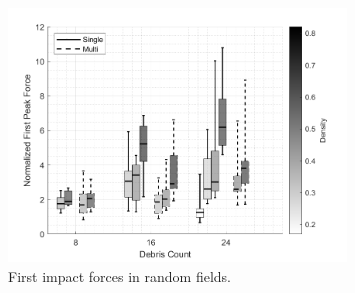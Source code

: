 \documentclass{article}
\begin{document}
\begin{figure}[htbp]
    \centering
    \includegraphics[width=0.8\textwidth]{First_Peak_Random_Single_vs_Multi_ByDensityGradient.png}
    \caption{First impact forces in random fields.}
    \label{fig:random_peaks_first}
\end{figure}
\end{document}
